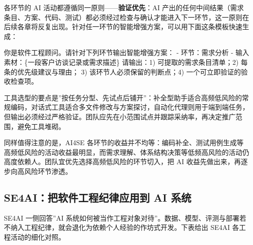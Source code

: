 \documentclass[12pt,a4paper,twoside,openany]{ctexbook}
\numberwithin{figure}{chapter}
\numberwithin{table}{chapter}
\newenvironment{Shaded}{}{}
\newcommand{\NormalTok}[1]{#1}
\begin{document}
各环节的 AI 活动都遵循同一原则------\textbf{验证优先}：AI
产出的任何中间结果（需求条目、方案、代码、测试）都必须经过检查与确认才能进入下一环节，这一原则在后续各章将反复出现。针对任一环节的智能增强方案，可以用下面这条模板快速生成：

\begin{Shaded}
\begin{Highlighting}[]
\NormalTok{你是软件工程顾问。请针对下列环节输出智能增强方案：}
\NormalTok{{-} 环节：需求分析}
\NormalTok{{-} 输入素材：\{一段客户访谈记录或需求描述\}}
\NormalTok{请输出：1) 可提取的需求条目清单；2) 每条的优先级建议与理由；}
\NormalTok{3) 该环节人必须保留的判断点；4) 一个可立即验证的验收检查项。}
\end{Highlighting}
\end{Shaded}

工具选型的要点是''按任务分型、先试点后铺开''：补全型助手适合高频低风险的常规编码，对话式工具适合多文件修改与方案探讨，自动化代理则用于端到端任务，但输出必须经过严格验证。团队应先在小范围试点并跟踪采纳率，再决定推广范围，避免工具堆砌。

同样值得注意的是，AI4SE
各环节的收益并不均等：编码补全、测试用例生成等高频低风险的活动收益最明显，而需求理解、体系结构决策等低频高风险的活动仍高度依赖人。团队宜优先选择高频低风险的环节切入，把
AI 收益先做出来，再逐步向高风险环节渗透。

\subsection{SE4AI：把软件工程纪律应用到 AI
系统}\label{se4aiux628aux8f6fux4ef6ux5de5ux7a0bux7eaaux5f8bux5e94ux7528ux5230-ai-ux7cfbux7edf}

SE4AI 一侧回答''AI
系统如何被当作工程对象对待''。数据、模型、评测与部署若不纳入工程纪律，就会退化为依赖个人经验的作坊式开发。下表给出
SE4AI 各工程活动的细化对照。
\end{document}
